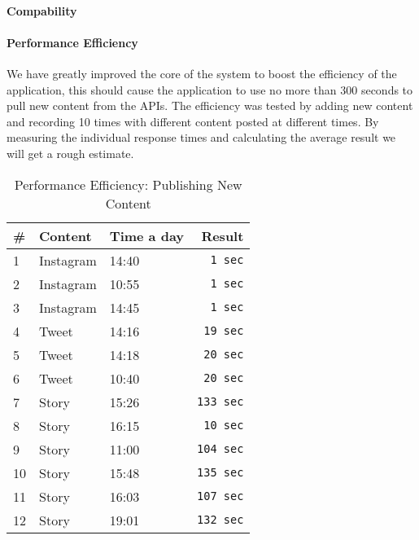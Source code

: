 \paragraph{Compability}

\paragraph{Performance Efficiency}
We have greatly improved the core of the system to boost the efficiency of the application, this should cause the application to use no more than 300 seconds to pull new content from the APIs. The efficiency was tested by adding new content and recording 10 times with different content posted at different times. By measuring the individual response times and calculating the average result we will get a rough estimate.\\

\begin{table}[!htp]
\begin{center}
	\begin{tabular}{ | l | l | l | r | }
	\hline
	 \#	 	& Content 		& Time a day 		& Result \\ \hline
	 1		&Instagram		& 14:40			& \texttt{1 sec} \\ \hline
	 2		&Instagram		& 10:55			& \texttt{1 sec} \\ \hline
	 3		&Instagram		& 14:45			& \texttt{1 sec} \\ \hline
	 4		&Tweet		& 14:16			& \texttt{19 sec} \\ \hline
	 5		&Tweet		& 14:18			& \texttt{20 sec} \\ \hline
	 6		&Tweet		& 10:40			& \texttt{20 sec} \\ \hline
	 7		&Story		& 15:26			& \texttt{133 sec}\\ \hline
	 8		&Story		& 16:15			& \texttt{10 sec}\\ \hline
	 9		&Story 		& 11:00			& \texttt{104 sec}\\ \hline
	 10		&Story		& 15:48			& \texttt{135 sec}\\ \hline
	 11		&Story		& 16:03			& \texttt{107 sec}\\ \hline
	 12		&Story		& 19:01			& \texttt{132 sec}\\ 
	 \hline
 	 \end{tabular}
\end{center}
\caption{Performance Efficiency: Publishing New Content}
\label{tab:Performance Efficiency: Publishing New Content}
\end{table}

